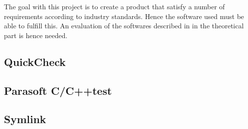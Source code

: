 The goal with this project is to create a product that satisfy a number of
requirements according to industry standards. Hence the software used must be
able to fulfill this. An evaluation of the softwares described in in the
theoretical part is hence needed.

\subsection{QuickCheck}

\subsection{Parasoft C/C++test}

\subsection{Symlink}
